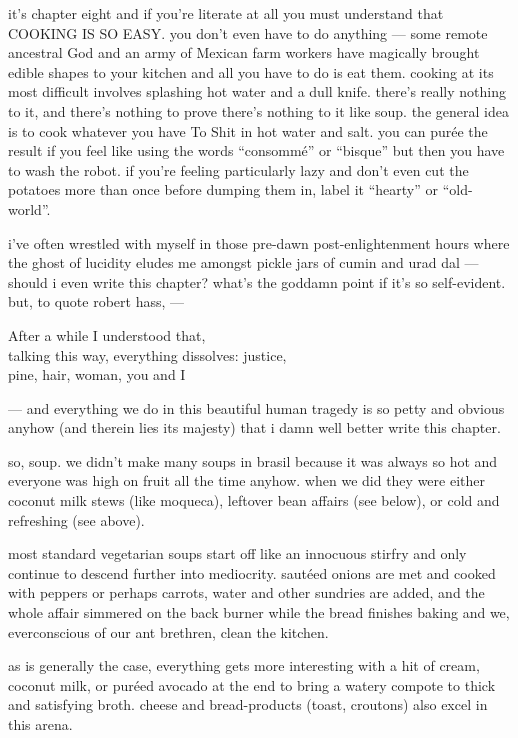 it's chapter eight and if you're literate at all you must understand
that COOKING IS SO EASY. you don't even have to do anything --- some
remote ancestral God and an army of Mexican farm workers have
magically brought edible shapes to your kitchen and all you have to do
is eat them. cooking at its most difficult involves splashing hot
water and a dull knife. there's really nothing to it, and there's
nothing to prove there's nothing to it like soup. the general idea is
to cook whatever you have To Shit in hot water and salt. you can
pur\'{e}e the result if you feel like using the words ``consomm\'{e}''
or ``bisque'' but then you have to wash the robot. if you're feeling
particularly lazy and don't even cut the potatoes more than once
before dumping them in, label it ``hearty'' or ``old-world''.

i've often wrestled with myself in those pre-dawn post-enlightenment
hours where the ghost of lucidity eludes me amongst pickle jars of
cumin and urad dal --- should i even write this chapter? what's the
goddamn point if it's so self-evident. but, to quote robert hass, ---

\smallskip
\makebox[1cm]{}After a while I understood that,\\
\makebox[1cm]{}talking this way, everything dissolves: justice,\\
\makebox[1cm]{}pine, hair, woman, you and I
\smallskip

--- and everything we do in this beautiful human tragedy is so petty
and obvious anyhow (and therein lies its majesty) that i damn well
better write this chapter.

so, soup. we didn't make many soups in brasil because it was always so
hot and everyone was high on fruit all the time anyhow. when we did
they were either coconut milk stews (like moqueca), leftover bean
affairs (see below), or cold and refreshing (see above).

most standard vegetarian soups start off like an innocuous stirfry and
only continue to descend further into mediocrity. saut\'{e}ed onions
are met and cooked with peppers or perhaps carrots, water and other
sundries are added, and the whole affair simmered on the back burner
while the bread finishes baking and we, everconscious of our ant
brethren, clean the kitchen.

as is generally the case, everything gets more interesting with a hit
of cream, coconut milk, or pur\'{e}ed avocado at the end to bring a
watery compote to thick and satisfying broth. cheese and
bread-products (toast, croutons) also excel in this arena.

